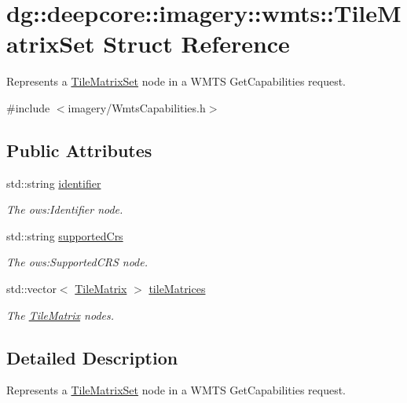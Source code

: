 \hypertarget{structdg_1_1deepcore_1_1imagery_1_1wmts_1_1_tile_matrix_set}{}\section{dg\+:\+:deepcore\+:\+:imagery\+:\+:wmts\+:\+:Tile\+Matrix\+Set Struct Reference}
\label{structdg_1_1deepcore_1_1imagery_1_1wmts_1_1_tile_matrix_set}


Represents a \hyperlink{structdg_1_1deepcore_1_1imagery_1_1wmts_1_1_tile_matrix_set}{Tile\+Matrix\+Set} node in a W\+M\+TS Get\+Capabilities request.  




{\ttfamily \#include $<$imagery/\+Wmts\+Capabilities.\+h$>$}

\subsection*{Public Attributes}
\begin{DoxyCompactItemize}
\item 
std\+::string \hyperlink{structdg_1_1deepcore_1_1imagery_1_1wmts_1_1_tile_matrix_set_a2b6b1065b7596abbadab0ae4889c3e5c}{identifier}
\begin{DoxyCompactList}\small\item\em The ows\+:Identifier node. \end{DoxyCompactList}\item 
std\+::string \hyperlink{structdg_1_1deepcore_1_1imagery_1_1wmts_1_1_tile_matrix_set_a1105d518a115fa42e1bf1d9e1eaf41f0}{supported\+Crs}
\begin{DoxyCompactList}\small\item\em The ows\+:Supported\+C\+RS node. \end{DoxyCompactList}\item 
std\+::vector$<$ \hyperlink{structdg_1_1deepcore_1_1imagery_1_1wmts_1_1_tile_matrix}{Tile\+Matrix} $>$ \hyperlink{structdg_1_1deepcore_1_1imagery_1_1wmts_1_1_tile_matrix_set_a7359847b6ccb8bb86a41640e43e15876}{tile\+Matrices}
\begin{DoxyCompactList}\small\item\em The \hyperlink{structdg_1_1deepcore_1_1imagery_1_1wmts_1_1_tile_matrix}{Tile\+Matrix} nodes. \end{DoxyCompactList}\end{DoxyCompactItemize}


\subsection{Detailed Description}
Represents a \hyperlink{structdg_1_1deepcore_1_1imagery_1_1wmts_1_1_tile_matrix_set}{Tile\+Matrix\+Set} node in a W\+M\+TS Get\+Capabilities request. 

